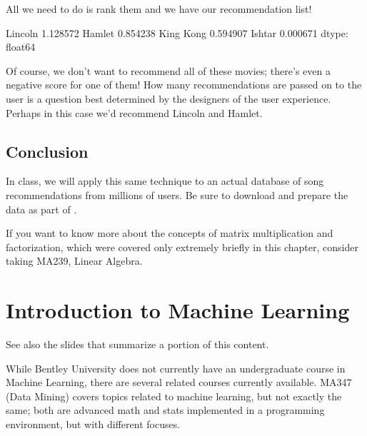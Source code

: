 \documentclass[letterpaper,10pt,english]{jupyterBook}
\begin{document}
\sphinxAtStartPar
All we need to do is rank them and we have our recommendation list!

\begin{sphinxVerbatim}[commandchars=\\\{\}]
\PYG{p}{[}\PYG{p}{]}  
\end{sphinxVerbatim}

\begin{sphinxVerbatim}[commandchars=\\\{\}]
Lincoln      1.128572
Hamlet       0.854238
King Kong    0.594907
Ishtar      \PYGZhy{}0.000671
dtype: float64
\end{sphinxVerbatim}

\sphinxAtStartPar
Of course, we don’t want to recommend all of these movies; there’s even a negative score for one of them!  How many recommendations are passed on to the user is a question best determined by the designers of the user experience.  Perhaps in this case we’d recommend Lincoln and Hamlet.


\section{Conclusion}
\label{\detokenize{chapter-16-matrices:conclusion}}
\sphinxAtStartPar
In class, we will apply this same technique to an actual database of song recommendations from millions of users.  Be sure to download and prepare the data as part of .

\sphinxAtStartPar
If you want to know more about the concepts of matrix multiplication and factorization, which were covered only extremely briefly in this chapter, consider taking MA239, Linear Algebra.


\chapter{Introduction to Machine Learning}
\label{\detokenize{chapter-17-machine-learning:introduction-to-machine-learning}}\label{\detokenize{chapter-17-machine-learning::doc}}
\sphinxAtStartPar
See also the slides that summarize a portion of this content.

\sphinxAtStartPar
While Bentley University does not currently have an undergraduate course in Machine Learning, there are several related courses currently available.  MA347 (Data Mining) covers topics related to machine learning, but not exactly the same; both are advanced math and stats implemented in a programming environment, but with different focuses.
\end{document}
